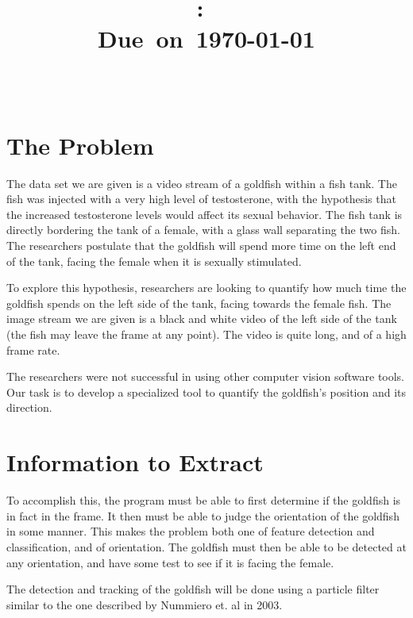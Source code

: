 \documentclass[english]{report}
\title{\vspace{2in}\textmd{\textbf{\hmwkClass:\
\hmwkTitle}}\\\normalsize\vspace{0.1in}\small{Due\ on\
\today}\\\vspace{0.1in}\large{\textit{\classInstructor\ }}\vspace{3in}}
\date{}
\author{\textbf{\authorName}}
\begin{document}
\begin{spacing}{1.1}


\section{The Problem}

The data set we are given is a video stream of a goldfish within a fish
tank. The fish was injected with a very high level of testosterone, with
the hypothesis that the increased testosterone levels would affect its
sexual behavior. The fish tank is directly bordering the tank of a
female, with a glass wall separating the two fish. The researchers
postulate that the goldfish will spend more time on the left end of the
tank, facing the female when it is sexually stimulated.

To explore this hypothesis, researchers are looking to quantify how much
time the goldfish spends on the left side of the tank, facing towards
the female fish. The image stream we are given is a black and white
video of the left side of the tank (the fish may leave the frame at any
point). The video is quite long, and of a high frame rate.

The researchers were not successful in using other computer vision
software tools. Our task is to develop a specialized tool to quantify
the goldfish's position and its direction.

\section{Information to Extract}
To accomplish this, the program must be able to first determine if the
goldfish is in fact in the frame. It then must be able to judge the
orientation of the goldfish in some manner. This makes the problem both
one of feature detection and classification, and of orientation. The
goldfish must then be able to be detected at any orientation, and have
some test to see if it is facing the female.

The detection and tracking of the goldfish will be done using a particle
filter similar to the one described by Nummiero et. al in 2003.

\end{spacing}
\end{document}
